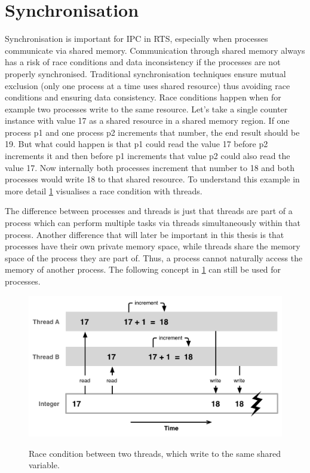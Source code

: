 \section{Synchronisation}\label{sec:synchronization}

Synchronisation is important for \ac{IPC} in \ac{RTS}, especially when processes communicate via shared memory. Communication through shared memory always has a risk of race conditions and data inconsistency if the processes are not properly synchronised. Traditional synchronisation techniques ensure mutual exclusion (only one process at a time uses shared resource) thus avoiding race conditions and ensuring data consistency. Race conditions happen when for example two processes write to the same resource. Let's take a single counter instance with value 17 as a shared resource in a shared memory region. If one process p1 and one process p2 increments that number, the end result should be 19. But what could happen is that p1 could read the value 17 before p2 increments it and then before p1 increments that value p2 could also read the value 17. Now internally both processes increment that number to 18 and both processes would write 18 to that shared resource. To understand this example in more detail \cref{fig:race-condition} visualises a race condition with threads. 

The difference between processes and threads is just that threads are part of a process which can perform multiple tasks via threads simultaneously within that process. Another difference that will later be important in this thesis is that processes have their own private memory space, while threads share the memory space of the process they are part of. Thus, a process cannot naturally access the memory of another process. The following concept in \cref{fig:race-condition} can still be used for processes. \cite{processesVSthreads}

\begin{figure}[!ht]
    \centering
    \captionsetup{justification=centering}
    \caption{Race condition between two threads, which write to the same shared variable.}
    \includegraphics[width=115mm]{images/race-condition.png}
    \cite{Race-Condition}
    \label{fig:race-condition}
\end{figure}

